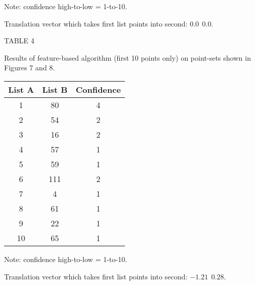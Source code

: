\begin{table}
\begin{center}
\bigskip

Note: confidence high-to-low = 1-to-10.

\medskip

Translation vector which takes first list points into second: 
$         0.0 \ \ 0.0$.

\medskip


\bigskip

\bigskip

\bigskip

\bigskip

\end{center}
\end{table}



\newpage 
\begin{table}
\begin{center}

TABLE 4

\smallskip

Results of feature-based algorithm (first 10 points only)  
on point-sets shown in Figures 7 and
8.


\bigskip

\bigskip

\bigskip

\begin{tabular}{c c c} \hline
List A  & List B & Confidence \\ \hline
       1   &   80  &     4  \\
       2   &   54  &     2  \\
       3   &   16  &     2  \\
       4   &   57  &     1  \\
       5   &   59  &     1  \\
       6   &  111  &     2   \\
       7   &    4  &     1   \\
       8   &   61  &     1   \\
       9   &   22  &     1   \\
      10   &   65  &     1   \\ \hline \hline 
\end{tabular}

\bigskip

Note: confidence high-to-low = 1-to-10.

\medskip

Translation vector which takes first list points into second: 
$       -1.21  \ \ 0.28$.

\medskip


\bigskip

\bigskip

\bigskip

\bigskip

\bigskip

\bigskip

\end{center}
\end{table}





